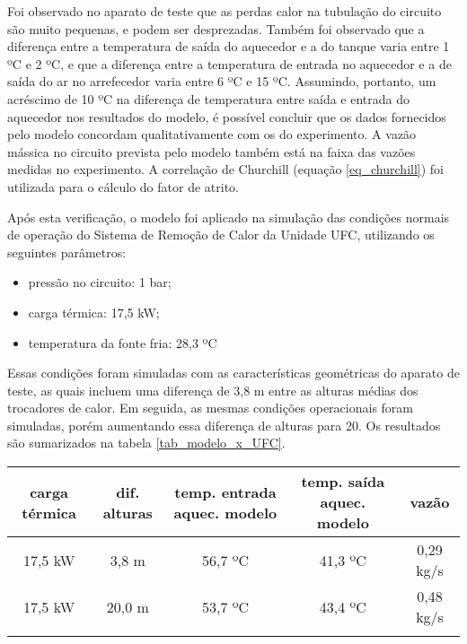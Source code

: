 \documentclass[a4paper,portuguese,10pt]{article}
\begin{document}
Foi observado no aparato de teste que as perdas calor na tubulação do circuito são muito pequenas, e podem ser desprezadas. Também foi observado que a diferença entre a temperatura de saída do aquecedor e a do tanque varia entre 1 ºC e 2 ºC, e que a diferença entre a temperatura de entrada no aquecedor e a de saída do ar no arrefecedor varia entre 6 ºC e 15 ºC. Assumindo, portanto, um acréscimo de 10 ºC na diferença de temperatura entre saída e entrada do aquecedor nos resultados do modelo, é possível concluir que os dados fornecidos pelo modelo concordam qualitativamente com os do experimento. A vazão mássica no circuito prevista pelo modelo também está na faixa das vazões medidas no experimento. A correlação de Churchill (equação \ref{eq_churchill}) foi utilizada para o cálculo do fator de atrito.

Após esta verificação, o modelo foi aplicado na simulação das condições normais de operação do Sistema de Remoção de Calor da Unidade UFC, utilizando os seguintes parâmetros:

\begin{itemize}
\item pressão no circuito: 1 bar;
\item carga térmica: 17,5 kW;
\item temperatura da fonte fria: 28,3 ºC
\end{itemize}

Essas condições foram simuladas com as características geométricas do aparato de teste, as quais incluem uma diferença de 3,8 m entre as alturas médias dos trocadores de calor. Em seguida, as mesmas condições operacionais foram simuladas, porém aumentando essa diferença de alturas para 20. Os resultados são sumarizados na tabela \ref{tab_modelo_x_UFC}.

\begin{center}
\begin{tabular}{ccccc}
  \hline
  carga térmica & dif. alturas & temp. entrada aquec. modelo & temp. saída aquec. modelo & vazão\\
  \hline
  17,5 kW & 3,8 m & 56,7 ºC & 41,3 ºC & 0,29 kg/s\\
  17,5 kW & 20,0 m & 53,7 ºC & 43,4 ºC & 0,48 kg/s\\
  \hline\\
\end{tabular}
\label{tab_modelo_x_UFC}
\end{center}
\end{document}
